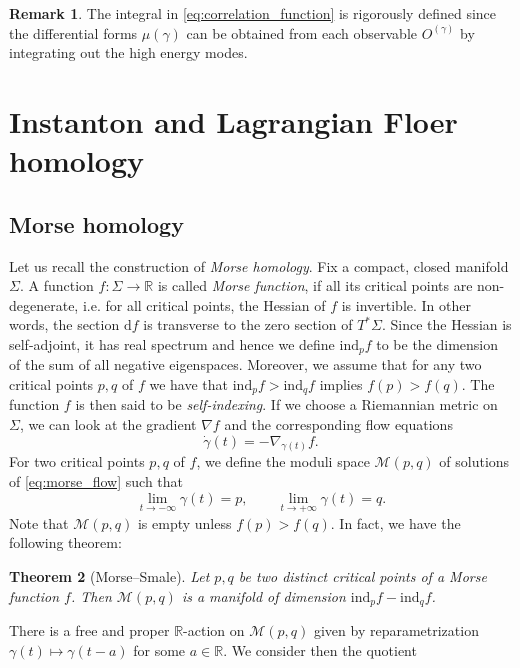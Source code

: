 \documentclass[11pt,colorinlistoftodos]{amsart}
\numberwithin{equation}{subsection}
\theoremstyle{plain}
\newtheorem{thm}{Theorem}[subsection]
\theoremstyle{definition}
\newtheorem{rem}[thm]{Remark}
\theoremstyle{remark}
\newcommand{\R}{\mathbb{R}}
\newcommand{\dd}{{\mathrm{d}}}
\newcommand{\calM}{\mathcal{M}}
\begin{document}
\begin{rem}
The integral in \eqref{eq:correlation_function} is rigorously defined since the differential forms $\mu(\gamma)$ can be obtained from each observable $O^{(\gamma)}$ by integrating out the high energy modes. 
\end{rem}


\section{Instanton and Lagrangian Floer homology}
\label{sec:instanton_and_Lagrangian_Floer_homology}
\subsection{Morse homology}
\label{subsec:Morse_homology}
Let us recall the construction of \emph{Morse homology}. Fix a compact, closed manifold $\Sigma$. A function $f\colon \Sigma\to \R$ is called \emph{Morse function}, if all its critical points are non-degenerate, i.e. for all critical points, the Hessian of $f$ is invertible. In other words, the section $\dd f$ is transverse to the zero section of $T^*\Sigma$.
Since the Hessian is self-adjoint, it has real spectrum and hence we define $\mathrm{ind}_pf$ to be the dimension of the sum of all negative eigenspaces. Moreover, we assume that for any two critical points $p,q$ of $f$ we have that $\mathrm{ind}_pf>\mathrm{ind}_qf$ implies $f(p)>f(q)$. The function $f$ is then said to be \emph{self-indexing}. If we choose a Riemannian metric on $\Sigma$, we can look at the gradient $\nabla f$ and the corresponding flow equations
\begin{equation}
\label{eq:morse_flow}
    \dot{\gamma}(t)=-\nabla_{\gamma(t)}f.
\end{equation}
For two critical points $p,q$ of $f$, we define the moduli space $\calM(p,q)$ of solutions of \eqref{eq:morse_flow} such that
\begin{equation}
    \lim_{t\to -\infty}\gamma(t)=p,\qquad \lim_{t\to+\infty}\gamma(t)=q.
\end{equation}
Note that $\calM(p,q)$ is empty unless $f(p)>f(q)$. In fact, we have the following theorem:
\begin{thm}[Morse--Smale]
Let $p,q$ be two distinct critical points of a Morse function $f$.
Then $\calM(p,q)$ is a manifold of dimension $\mathrm{ind}_pf-\mathrm{ind}_qf$.
\end{thm}
There is a free and proper $\R$-action on $\calM(p,q)$ given by reparametrization $\gamma(t)\mapsto \gamma(t-a)$ for some $a\in \R$. We consider then the quotient 
\end{document}
